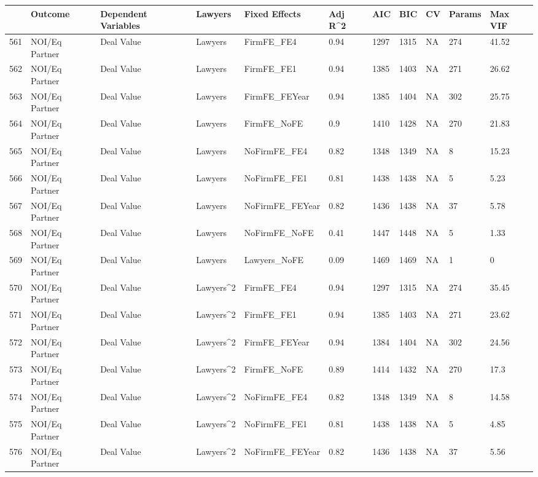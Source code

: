 \begin{table}[ht]
\centering
\begin{tabular}{rllllllllll}
  \hline
 & Outcome & Dependent Variables & Lawyers & Fixed Effects & Adj R^2 & AIC & BIC & CV & Params & Max VIF \\ 
  \hline
561 & NOI/Eq Partner & Deal Value & Lawyers & FirmFE\_FE4 & 0.94 & 1297 & 1315 & NA & 274 & 41.52 \\ 
  562 & NOI/Eq Partner & Deal Value & Lawyers & FirmFE\_FE1 & 0.94 & 1385 & 1403 & NA & 271 & 26.62 \\ 
  563 & NOI/Eq Partner & Deal Value & Lawyers & FirmFE\_FEYear & 0.94 & 1385 & 1404 & NA & 302 & 25.75 \\ 
  564 & NOI/Eq Partner & Deal Value & Lawyers & FirmFE\_NoFE & 0.9 & 1410 & 1428 & NA & 270 & 21.83 \\ 
  565 & NOI/Eq Partner & Deal Value & Lawyers & NoFirmFE\_FE4 & 0.82 & 1348 & 1349 & NA & 8 & 15.23 \\ 
  566 & NOI/Eq Partner & Deal Value & Lawyers & NoFirmFE\_FE1 & 0.81 & 1438 & 1438 & NA & 5 & 5.23 \\ 
  567 & NOI/Eq Partner & Deal Value & Lawyers & NoFirmFE\_FEYear & 0.82 & 1436 & 1438 & NA & 37 & 5.78 \\ 
  568 & NOI/Eq Partner & Deal Value & Lawyers & NoFirmFE\_NoFE & 0.41 & 1447 & 1448 & NA & 5 & 1.33 \\ 
  569 & NOI/Eq Partner & Deal Value & Lawyers & Lawyers\_NoFE & 0.09 & 1469 & 1469 & NA & 1 & 0 \\ 
  570 & NOI/Eq Partner & Deal Value & Lawyers^2 & FirmFE\_FE4 & 0.94 & 1297 & 1315 & NA & 274 & 35.45 \\ 
  571 & NOI/Eq Partner & Deal Value & Lawyers^2 & FirmFE\_FE1 & 0.94 & 1385 & 1403 & NA & 271 & 23.62 \\ 
  572 & NOI/Eq Partner & Deal Value & Lawyers^2 & FirmFE\_FEYear & 0.94 & 1384 & 1404 & NA & 302 & 24.56 \\ 
  573 & NOI/Eq Partner & Deal Value & Lawyers^2 & FirmFE\_NoFE & 0.89 & 1414 & 1432 & NA & 270 & 17.3 \\ 
  574 & NOI/Eq Partner & Deal Value & Lawyers^2 & NoFirmFE\_FE4 & 0.82 & 1348 & 1349 & NA & 8 & 14.58 \\ 
  575 & NOI/Eq Partner & Deal Value & Lawyers^2 & NoFirmFE\_FE1 & 0.81 & 1438 & 1438 & NA & 5 & 4.85 \\ 
  576 & NOI/Eq Partner & Deal Value & Lawyers^2 & NoFirmFE\_FEYear & 0.82 & 1436 & 1438 & NA & 37 & 5.56 \\ 

\end{tabular}
\end{table}
